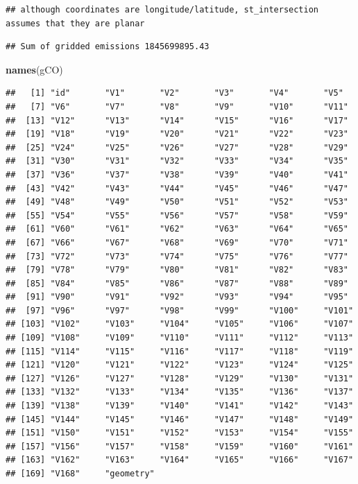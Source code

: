 \documentclass[12pt,graybox,envcountchap,sectrefs]{krantz}
\makeatletter
\newenvironment{Shaded}{\begin{snugshade}}{\end{snugshade}}
\newcommand{\KeywordTok}[1]{\textcolor[rgb]{0.13,0.29,0.53}{\textbf{#1}}}
\newcommand{\NormalTok}[1]{#1}
\newenvironment{kframe}{%
\medskip{}
\setlength{\fboxsep}{.8em}
 \def\at@end@of@kframe{}%
 \ifinner\ifhmode%
  \def\at@end@of@kframe{\end{minipage}}%
  \begin{minipage}{\columnwidth}%
 \fi\fi%
 \def\FrameCommand##1{\hskip\@totalleftmargin \hskip-\fboxsep
 \colorbox{shadecolor}{##1}\hskip-\fboxsep
     \hskip-\linewidth \hskip-\@totalleftmargin \hskip\columnwidth}%
 \MakeFramed {\advance\hsize-\width
   \@totalleftmargin\z@ \linewidth\hsize
   \@setminipage}}%
 {\par\unskip\endMakeFramed%
 \at@end@of@kframe}
\renewenvironment{Shaded}{\begin{kframe}}{\end{kframe}}
\theoremstyle{definition}
\theoremstyle{definition}
\theoremstyle{definition}
\theoremstyle{remark}
\makeatother
\begin{document}
\begin{verbatim}
## although coordinates are longitude/latitude, st_intersection assumes that they are planar
\end{verbatim}

\begin{verbatim}
## Sum of gridded emissions 1845699895.43
\end{verbatim}

\begin{Shaded}
\begin{Highlighting}[]
\KeywordTok{names}\NormalTok{(gCO)}
\end{Highlighting}
\end{Shaded}

\begin{verbatim}
##   [1] "id"       "V1"       "V2"       "V3"       "V4"       "V5"      
##   [7] "V6"       "V7"       "V8"       "V9"       "V10"      "V11"     
##  [13] "V12"      "V13"      "V14"      "V15"      "V16"      "V17"     
##  [19] "V18"      "V19"      "V20"      "V21"      "V22"      "V23"     
##  [25] "V24"      "V25"      "V26"      "V27"      "V28"      "V29"     
##  [31] "V30"      "V31"      "V32"      "V33"      "V34"      "V35"     
##  [37] "V36"      "V37"      "V38"      "V39"      "V40"      "V41"     
##  [43] "V42"      "V43"      "V44"      "V45"      "V46"      "V47"     
##  [49] "V48"      "V49"      "V50"      "V51"      "V52"      "V53"     
##  [55] "V54"      "V55"      "V56"      "V57"      "V58"      "V59"     
##  [61] "V60"      "V61"      "V62"      "V63"      "V64"      "V65"     
##  [67] "V66"      "V67"      "V68"      "V69"      "V70"      "V71"     
##  [73] "V72"      "V73"      "V74"      "V75"      "V76"      "V77"     
##  [79] "V78"      "V79"      "V80"      "V81"      "V82"      "V83"     
##  [85] "V84"      "V85"      "V86"      "V87"      "V88"      "V89"     
##  [91] "V90"      "V91"      "V92"      "V93"      "V94"      "V95"     
##  [97] "V96"      "V97"      "V98"      "V99"      "V100"     "V101"    
## [103] "V102"     "V103"     "V104"     "V105"     "V106"     "V107"    
## [109] "V108"     "V109"     "V110"     "V111"     "V112"     "V113"    
## [115] "V114"     "V115"     "V116"     "V117"     "V118"     "V119"    
## [121] "V120"     "V121"     "V122"     "V123"     "V124"     "V125"    
## [127] "V126"     "V127"     "V128"     "V129"     "V130"     "V131"    
## [133] "V132"     "V133"     "V134"     "V135"     "V136"     "V137"    
## [139] "V138"     "V139"     "V140"     "V141"     "V142"     "V143"    
## [145] "V144"     "V145"     "V146"     "V147"     "V148"     "V149"    
## [151] "V150"     "V151"     "V152"     "V153"     "V154"     "V155"    
## [157] "V156"     "V157"     "V158"     "V159"     "V160"     "V161"    
## [163] "V162"     "V163"     "V164"     "V165"     "V166"     "V167"    
## [169] "V168"     "geometry"
\end{verbatim}
\end{document}
